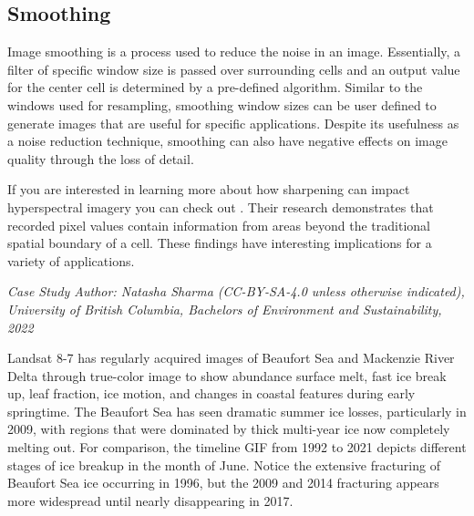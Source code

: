 \documentclass[
]{book}
\begin{document}
\subsection{Smoothing}\label{smoothing}

Image smoothing is a process used to reduce the noise in an image. Essentially, a filter of specific window size is passed over surrounding cells and an output value for the center cell is determined by a pre-defined algorithm. Similar to the windows used for resampling, smoothing window sizes can be user defined to generate images that are useful for specific applications. Despite its usefulness as a noise reduction technique, smoothing can also have negative effects on image quality through the loss of detail.

If you are interested in learning more about how sharpening can impact hyperspectral imagery you can check out \citep{inamdar_characterizing_2020}. Their research demonstrates that recorded pixel values contain information from areas beyond the traditional spatial boundary of a cell. These findings have interesting implications for a variety of applications.

\emph{Case Study Author: Natasha Sharma (CC-BY-SA-4.0 unless otherwise indicated), University of British Columbia, Bachelors of Environment and Sustainability, 2022}

Landsat 8-7 has regularly acquired images of Beaufort Sea and Mackenzie River Delta through true-color image to show abundance surface melt, fast ice break up, leaf fraction, ice motion, and changes in coastal features during early springtime. The Beaufort Sea has seen dramatic summer ice losses, particularly in 2009, with regions that were dominated by thick multi-year ice now completely melting out. For comparison, the timeline GIF from 1992 to 2021 depicts different stages of ice breakup in the month of June. Notice the extensive fracturing of Beaufort Sea ice occurring in 1996, but the 2009 and 2014 fracturing appears more widespread until nearly disappearing in 2017.
\end{document}
